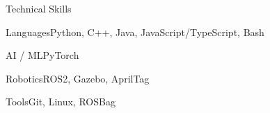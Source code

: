 \documentclass[
	11pt
]{../../../template}
\begin{document}
	\begin{rSection}{T}{echnical Skills}
		\begin{rSet}{Languages}{Python, C++, Java, JavaScript/TypeScript, Bash}
		\end{rSet}
		\begin{rSet}{AI / ML}{PyTorch}
		\end{rSet}
		\begin{rSet}{Robotics}{ROS2, Gazebo, AprilTag}
		\end{rSet}
		\begin{rSet}{Tools}{Git, Linux, ROSBag}
		\end{rSet}
	\end{rSection}
\end{document}
